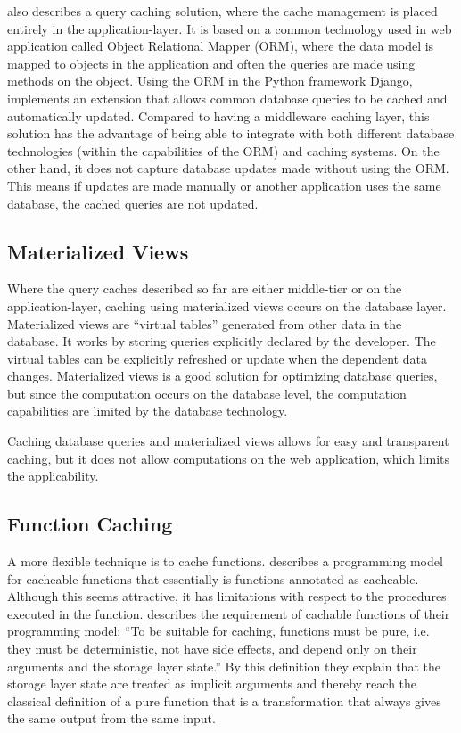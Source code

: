 \cite{paper:cache-genie} also describes a query caching solution, where the cache management is placed entirely in the application-layer. It is based on a common technology used in web application called Object Relational Mapper (ORM), where the data model is mapped to objects in the application and often the queries are made using methods on the object. Using the ORM in the Python framework Django, \cite{paper:cache-genie} implements an extension that allows common database queries to be cached and automatically updated. Compared to having a middleware caching layer, this solution has the advantage of being able to integrate with both different database technologies (within the capabilities of the ORM) and caching systems. On the other hand, it does not capture database updates made without using the ORM. This means if updates are made manually or another application uses the same database, the cached queries are not updated.

\subsection{Materialized Views}

Where the query caches described so far are either middle-tier or on the application-layer, caching using materialized views occurs on the database layer. Materialized views are “virtual tables” generated from other data in the database. It works by storing queries explicitly declared by the developer. The virtual tables can be explicitly refreshed or update when the dependent data changes. Materialized views is a good solution for optimizing database queries, but since the computation occurs on the database level, the computation capabilities are limited by the database technology.

Caching database queries and materialized views allows for easy and transparent caching, but it does not allow computations on the web application, which limits the applicability.

\subsection{Function Caching}

A more flexible technique is to cache functions. \cite{paper:liskov} describes a programming model for cacheable functions that essentially is functions annotated as cacheable. Although this seems attractive, it has limitations with respect to the procedures executed in the function. \cite{paper:liskov} describes the requirement of cachable functions of their programming model: “To be suitable for caching, functions must be pure, i.e. they must be deterministic, not have side effects, and depend only on their arguments and the storage layer state.” By this definition they explain that the storage layer state are treated as implicit arguments and thereby reach the classical definition of a pure function that is a transformation that always gives the same output from the same input.

